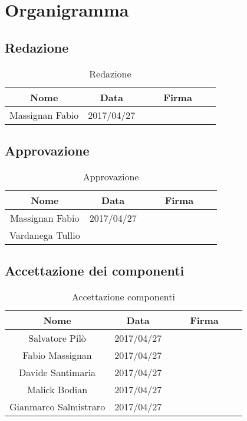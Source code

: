 \section{Organigramma}
	\subsection{Redazione}
	\begin{table}[H]
		\centering
		\begin{tabular}{|c|c|ccccc|}
			\hline
			\textbf{Nome}		& \textbf{Data}	&	&	& \textbf{Firma}	&	& \\
			\hline
			Massignan Fabio		& 		2017/04/27		&     &     &     &     & \\
			\hline
		\end{tabular}
		\caption{Redazione}
	\end{table}
	\subsection{Approvazione}
	\begin{table}[H]
		\centering
		\begin{tabular}{|c|c|ccccc|}
			\hline
			\textbf{Nome}		& \textbf{Data}	&	&	& \textbf{Firma}	&	& \\
			\hline
			Massignan Fabio		& 		2017/04/27		&     &     &     &     & \\
			Vardanega Tullio	& 				&     &     &     &     & \\
			\hline
		\end{tabular}
		\caption{Approvazione}
	\end{table}
	\subsection{Accettazione dei componenti}
	\begin{table}[H]
		\centering
		\begin{tabular}{|c|c|ccccc|}
			\hline
			\textbf{Nome}		& \textbf{Data}	&	&	& \textbf{Firma}	&	& \\
			\hline
			Salvatore Pilò			& 	2017/04/27	&     &     &     &     & \\
			Fabio Massignan			&	2017/04/27	&     &     &     &     & \\
			Davide Santimaria		&	2017/04/27	&     &     &     &     & \\
			Malick Bodian			& 	2017/04/27	&     &     &     &     & \\
			Gianmarco Salmistraro	&	2017/04/27	&     &     &     &     & \\
			\hline
		\end{tabular}
		\caption{Accettazione componenti}
	\end{table}
